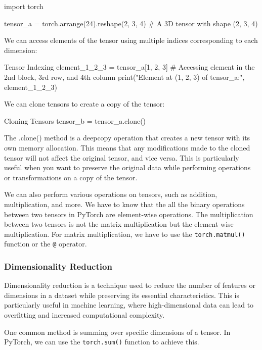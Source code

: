 \begin{pythoncode}
import torch

tensor_a = torch.arrange(24).reshape(2, 3, 4)  # A 3D tensor with shape (2, 3, 4)
\end{pythoncode}

We can access elements of the tensor using multiple indices corresponding to each dimension:
\begin{pythoncode}{Tensor Indexing}
element_1_2_3 = tensor_a[1, 2, 3]  # Accessing element in the 2nd block, 3rd row, and 4th column
print("Element at (1, 2, 3) of tensor_a:", element_1_2_3)
\end{pythoncode}

We can clone tensors to create a copy of the tensor:

\begin{pythoncode}{Cloning Tensors}
tensor_b = tensor_a.clone()
\end{pythoncode}

\begin{remark}
The .clone() method is a deepcopy operation that creates a new tensor with its own memory allocation. This means that any modifications made to the cloned tensor will not affect the original tensor, and vice versa. This is particularly useful when you want to preserve the original data while performing operations or transformations on a copy of the tensor.
\end{remark}

We can also perform various operations on tensors, such as addition, multiplication, and more. We have to know that the all the binary operations between two tensors in PyTorch are element-wise operations. The multiplication between two tensors is not the matrix multiplication but the element-wise multiplication. For matrix multiplication, we have to use the \texttt{torch.matmul()} function or the \texttt{@} operator.

\subsubsection{Dimensionality Reduction}

Dimensionality reduction is a technique used to reduce the number of features or dimensions in a dataset while preserving its essential characteristics. This is particularly useful in machine learning, where high-dimensional data can lead to overfitting and increased computational complexity.

One common method is summing over specific dimensions of a tensor. In PyTorch, we can use the \texttt{torch.sum()} function to achieve this.

